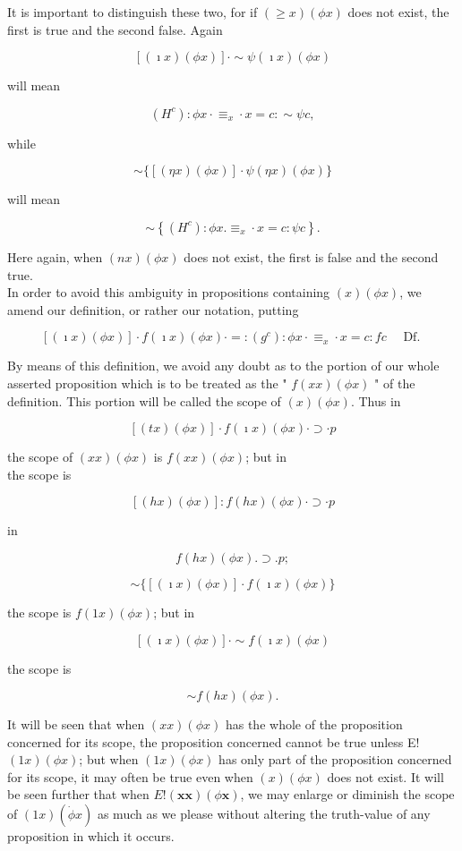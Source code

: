 \documentclass[10pt]{article}
\begin{document}
It is important to distinguish these two, for if $(\geqslant x)(\phi x)$ does not exist, the first is true and the second false. Again

$$
[(\imath x)(\phi x)] \cdot \sim \psi(\imath x)(\phi x)
$$

will mean

$$
\left(H^{c}\right): \phi x \cdot \equiv_{x} \cdot x=c: \sim \psi c,
$$

while

$$
\sim\{[(\eta x)(\phi x)] \cdot \psi(\eta x)(\phi x)\}
$$

will mean

$$
\sim\left\{\left(H^{c}\right): \phi x . \equiv_{x} \cdot x=c: \psi c\right\} .
$$

Here again, when $(n x)(\phi x)$ does not exist, the first is false and the second true.\\
In order to avoid this ambiguity in propositions containing $(x)(\phi x)$, we amend our definition, or rather our notation, putting

$$
[(\imath x)(\phi x)] \cdot f(\imath x)(\phi x) \cdot=:\left(g^{c}\right): \phi x \cdot \equiv_{x} \cdot x=c: f c \quad \text { Df. }
$$

By means of this definition, we avoid any doubt as to the portion of our whole asserted proposition which is to be treated as the " $f(x x)(\phi x)$ " of the definition. This portion will be called the scope of $(x)(\phi x)$. Thus in

$$
[(t x)(\phi x)] \cdot f(\imath x)(\phi x) \cdot \supset \cdot p
$$

the scope of $(x x)(\phi x)$ is $f(x x)(\phi x)$; but in\\
the scope is

$$
[(h x)(\phi x)]: f(h x)(\phi x) \cdot \supset \cdot p
$$

in

$$
f(h x)(\phi x) . \supset . p ;
$$

$$
\sim\{[(\imath x)(\phi x)] \cdot f(\imath x)(\phi x)\}
$$

the scope is $f(1 x)(\phi x)$; but in

$$
[(\imath x)(\phi x)] \cdot \sim f(\imath x)(\phi x)
$$

the scope is

$$
\sim f(h x)(\phi x) .
$$

It will be seen that when $(x x)(\phi x)$ has the whole of the proposition concerned for its scope, the proposition concerned cannot be true unless E! $(1 x)(\phi x)$; but when $(1 x)(\phi x)$ has only part of the proposition concerned for its scope, it may often be true even when $(x)(\phi x)$ does not exist. It will be seen further that when $E!(\boldsymbol{x} \boldsymbol{x})(\phi \boldsymbol{x})$, we may enlarge or diminish the scope of $(1 x)(\dot{\phi} x)$ as much as we please without altering the truth-value of any proposition in which it occurs.
\end{document}
